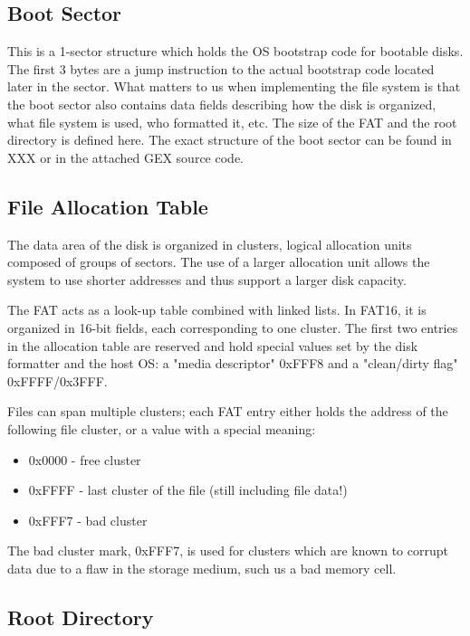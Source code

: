 \subsection{Boot Sector}

This is a 1-sector structure which holds the \gls{OS} bootstrap code for bootable disks. The first 3 bytes are a jump instruction to the actual bootstrap code located later in the sector. What matters to us when implementing the file system is that the boot sector also contains data fields describing how the disk is organized, what file system is used, who formatted it, etc. The size of the \gls{FAT} and the root directory is defined here. The exact structure of the boot sector can be found in XXX or in the attached GEX source code.

\subsection{File Allocation Table}

The data area of the disk is organized in clusters, logical allocation units composed of groups of sectors. The use of a larger allocation unit allows the system to use shorter addresses and thus support a larger disk capacity.

The \gls{FAT} acts as a look-up table combined with linked lists. In FAT16, it is organized in 16-bit fields, each corresponding to one cluster. The first two entries in the allocation table are reserved and hold special values set by the disk formatter and the host \gls{OS}: a "media descriptor" 0xFFF8 and a "clean/dirty flag" 0xFFFF/0x3FFF.

Files can span multiple clusters; each \gls{FAT} entry either holds the address of the following file cluster, or a value with a special meaning:

\begin{itemize}
	\item 0x0000 - free cluster
	\item 0xFFFF - last cluster of the file (still including file data!)
	\item 0xFFF7 - bad cluster
\end{itemize}

The bad cluster mark, 0xFFF7, is used for clusters which are known to corrupt data due to a flaw in the storage medium, such us a bad memory cell.

\subsection{Root Directory}

